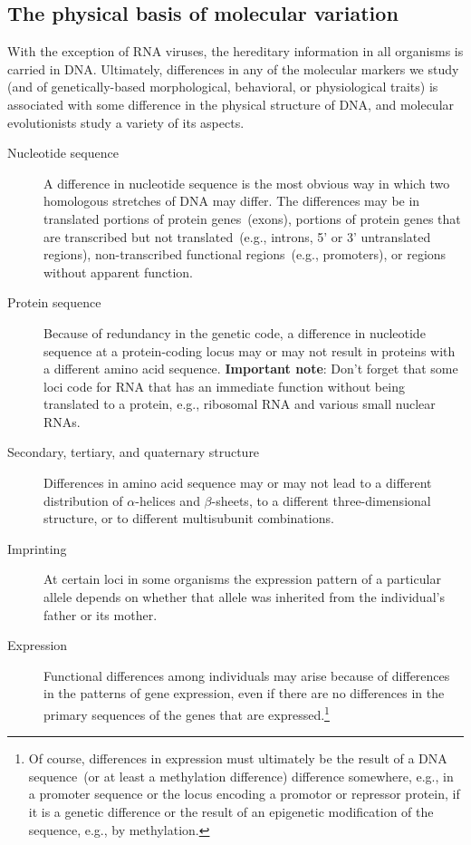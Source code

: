 \subsection*{The physical basis of molecular variation}

With the exception of RNA viruses, the hereditary information in all
organisms is carried in DNA. Ultimately, differences in any of the
molecular markers we study (and of genetically-based morphological,
behavioral, or physiological traits) is associated with some
difference in the physical structure of DNA, and molecular
evolutionists study a variety of its aspects.

\begin{description}

\item[Nucleotide sequence] A difference in nucleotide sequence is the
  most obvious way in which two homologous stretches of DNA may
  differ. The differences may be in translated portions of protein
  genes~(exons), portions of protein genes that are transcribed but
  not translated~(e.g., introns, 5' or 3' untranslated regions),
  non-transcribed functional regions~(e.g., promoters), or regions
  without apparent function.

\item[Protein sequence] Because of redundancy in the genetic code, a
  difference in nucleotide sequence at a protein-coding locus may or
  may not result in proteins with a different amino acid
  sequence. {\bf Important note}: Don't forget that some loci code for
  RNA that has an immediate function without being translated to a
  protein, e.g., ribosomal RNA and various small nuclear RNAs.

\item[Secondary, tertiary, and quaternary structure] Differences in
  amino acid sequence may or may not lead to a different distribution
  of $\alpha$-helices and $\beta$-sheets, to a different
  three-dimensional structure, or to different multisubunit
  combinations.

\item[Imprinting] At certain loci in some organisms the expression
  pattern of a particular allele depends on whether that allele was
  inherited from the individual's father or its mother.

\item[Expression] Functional differences among individuals may arise
  because of differences in the patterns of gene expression, even if
  there are no differences in the primary sequences of the genes that
  are expressed.\footnote{Of course, differences in expression must
    ultimately be the result of a DNA sequence~(or at least a
    methylation difference) difference somewhere, e.g., in a promoter
    sequence or the locus encoding a promotor or repressor protein, if
    it is a genetic difference or the result of an epigenetic
    modification of the sequence, e.g., by methylation.}


\end{description}
